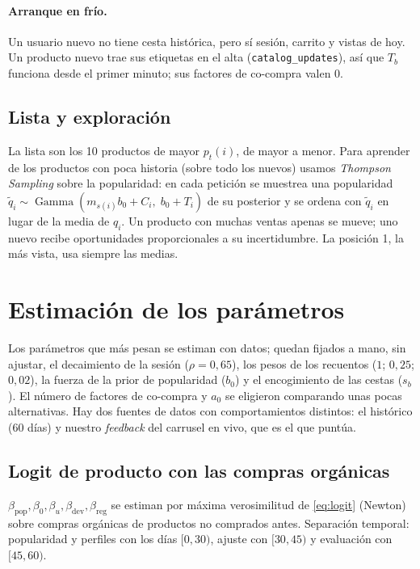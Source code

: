 \documentclass[11pt,a4paper]{article}
\newcommand{\Gam}{\operatorname{Gamma}}
\newcommand{\cod}[1]{\texttt{#1}}
\begin{document}
\paragraph{Arranque en frío.} Un usuario nuevo no tiene cesta histórica, pero sí sesión, carrito y vistas
de hoy. Un producto nuevo trae sus etiquetas en el alta (\cod{catalog\_updates}), así que $T_b$ funciona
desde el primer minuto; sus factores de co-compra valen 0.

\subsection{Lista y exploración}

La lista son los 10 productos de mayor $p_t(i)$, de mayor a menor. Para aprender de los productos
con poca historia (sobre todo los nuevos) usamos \emph{Thompson Sampling} sobre la popularidad: en cada
petición se muestrea una popularidad $\tilde q_i\sim\Gam(m_{s(i)}b_0+C_i,\;b_0+T_i)$ de su posterior y se
ordena con $\tilde q_i$ en lugar de la media de $q_i$. Un producto con muchas ventas apenas se mueve; uno nuevo recibe oportunidades proporcionales
a su incertidumbre. La posición 1, la más vista, usa siempre las medias.

\section{Estimación de los parámetros}

Los parámetros que más pesan se estiman con datos; quedan fijados a mano, sin ajustar, el decaimiento de la
sesión ($\rho=0{,}65$), los pesos de los recuentos ($1$; $0{,}25$; $0{,}02$), la fuerza de la prior de
popularidad ($b_0$) y el encogimiento de las cestas ($s_b$). El número de factores de co-compra y $a_0$ se
eligieron comparando unas pocas alternativas. Hay dos fuentes de datos con comportamientos distintos:
el histórico (60 días) y nuestro \emph{feedback} del carrusel en vivo, que es el que puntúa.

\subsection{Logit de producto con las compras orgánicas}

$\beta_{\text{pop}},\beta_0,\beta_u,\beta_{\text{dev}},\beta_{\text{reg}}$ se estiman por máxima
verosimilitud de \eqref{eq:logit} (Newton) sobre compras orgánicas de productos no comprados antes.
Separación temporal: popularidad y perfiles con los días $[0,30)$, ajuste con $[30,45)$ y evaluación
con $[45,60)$.
\end{document}
